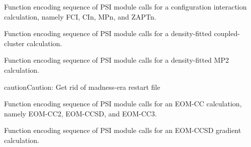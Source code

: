 \documentclass[letterpaper,10pt,english]{sphinxmanual}
\begin{document}
\begin{fulllineitems}
\label{index:proc.run_detci}
Function encoding sequence of PSI module calls for
a configuration interaction calculation, namely FCI,
CIn, MPn, and ZAPTn.

\end{fulllineitems}


\begin{fulllineitems}
\label{index:proc.run_dfcc}
Function encoding sequence of PSI module calls for
a density-fitted coupled-cluster calculation.

\end{fulllineitems}


\begin{fulllineitems}
\label{index:proc.run_dfmp2}
Function encoding sequence of PSI module calls for
a density-fitted MP2 calculation.

\begin{notice}{caution}{Caution:}
Get rid of madness-era restart file
\end{notice}

\end{fulllineitems}


\begin{fulllineitems}
\label{index:proc.run_eom_cc}
Function encoding sequence of PSI module calls for
an EOM-CC calculation, namely EOM-CC2, EOM-CCSD, and EOM-CC3.

\end{fulllineitems}


\begin{fulllineitems}
\label{index:proc.run_eom_cc_gradient}
Function encoding sequence of PSI module calls for
an EOM-CCSD gradient calculation.

\end{fulllineitems}
\end{document}
